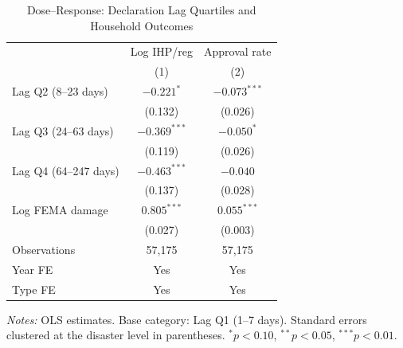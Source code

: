 \begin{table}[t]
\centering
\caption{Dose--Response: Declaration Lag Quartiles and Household Outcomes}
\label{tab:dose}
\begin{tabular}{lcc}
\toprule
 & Log IHP/reg & Approval rate \\
 & (1) & (2) \\
\midrule
Lag Q2 (8--23 days) & $-0.221^{*}$ & $-0.073^{***}$ \\
 & (0.132) & (0.026) \\
\addlinespace
Lag Q3 (24--63 days) & $-0.369^{***}$ & $-0.050^{*}$ \\
 & (0.119) & (0.026) \\
\addlinespace
Lag Q4 (64--247 days) & $-0.463^{***}$ & $-0.040$ \\
 & (0.137) & (0.028) \\
\addlinespace
Log FEMA damage & $0.805^{***}$ & $0.055^{***}$ \\
 & (0.027) & (0.003) \\
\midrule
Observations & 57,175 & 57,175 \\
Year FE & Yes & Yes \\
Type FE & Yes & Yes \\
\bottomrule
\end{tabular}
\begin{tablenotes}[flushleft]
\small
\item \textit{Notes:} OLS estimates. Base category: Lag Q1 (1--7 days).
Standard errors clustered at the disaster level in parentheses.
$^{*} p < 0.10$, $^{**} p < 0.05$, $^{***} p < 0.01$.
\end{tablenotes}
\end{table}
